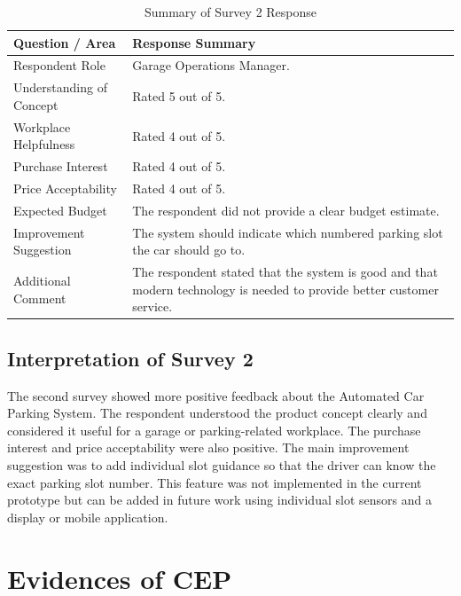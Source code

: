 \begin{table}[H]
\centering
\small
\renewcommand{\arraystretch}{1.15}
\caption{Summary of Survey 2 Response}
\label{tab:survey2_summary}
\begin{tabular}{|p{5cm}|p{8cm}|}
\hline
\textbf{Question / Area} & \textbf{Response Summary} \\
\hline
Respondent Role & Garage Operations Manager. \\
\hline
Understanding of Concept & Rated 5 out of 5. \\
\hline
Workplace Helpfulness & Rated 4 out of 5. \\
\hline
Purchase Interest & Rated 4 out of 5. \\
\hline
Price Acceptability & Rated 4 out of 5. \\
\hline
Expected Budget & The respondent did not provide a clear budget estimate. \\
\hline
Improvement Suggestion & The system should indicate which numbered parking slot the car should go to. \\
\hline
Additional Comment & The respondent stated that the system is good and that modern technology is needed to provide better customer service. \\
\hline
\end{tabular}
\normalsize
\end{table}

\subsection*{Interpretation of Survey 2}

The second survey showed more positive feedback about the Automated Car Parking System. The respondent understood the product concept clearly and considered it useful for a garage or parking-related workplace. The purchase interest and price acceptability were also positive. The main improvement suggestion was to add individual slot guidance so that the driver can know the exact parking slot number. This feature was not implemented in the current prototype but can be added in future work using individual slot sensors and a display or mobile application.

\section{Evidences of CEP}

